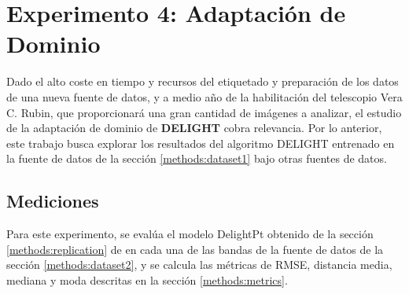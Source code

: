 \documentclass[../tesis.tex]{subfiles}
\begin{document}
\section{Experimento 4: Adaptación de Dominio}\label{methods:transfer_learning}
Dado el alto coste en tiempo y recursos del etiquetado y preparación de los datos de una nueva fuente de datos, y a medio año de la habilitación del telescopio Vera C. Rubin, que proporcionará una gran cantidad de imágenes a analizar, el estudio de la adaptación de dominio de \textbf{DELIGHT} cobra relevancia. Por lo anterior, este trabajo busca explorar los resultados del algoritmo DELIGHT entrenado en la fuente de datos de la sección \ref{methods:dataset1} bajo otras fuentes de datos.\par\null\par

\subsection{Mediciones}
Para este experimento, se evalúa el modelo DelightPt obtenido de la sección \ref{methods:replication} de en cada una de las bandas de la fuente de datos de la sección \ref{methods:dataset2}, y se calcula las métricas de RMSE, distancia media, mediana y moda descritas en la sección \ref{methods:metrics}.
\end{document}
